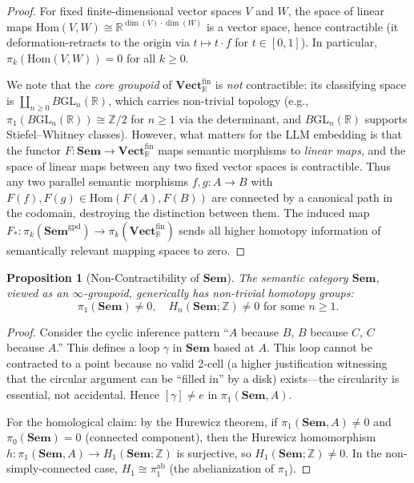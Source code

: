 \documentclass[11pt,a4paper]{article}
\theoremstyle{plain}
\newtheorem{proposition}[theorem]{Proposition}
\theoremstyle{definition}
\theoremstyle{remark}
\newcommand{\Sem}{\mathbf{Sem}}
\newcommand{\Vect}{\mathbf{Vect}}
\newcommand{\Hom}{\mathrm{Hom}}
\newcommand{\Z}{\mathbb{Z}}
\newcommand{\R}{\mathbb{R}}
\begin{document}
\begin{proof}
For fixed finite-dimensional vector spaces $V$ and $W$, the space of linear maps $\Hom(V, W) \cong \R^{\dim(V) \cdot \dim(W)}$ is a vector space, hence contractible (it deformation-retracts to the origin via $t \mapsto t \cdot f$ for $t \in [0,1]$). In particular, $\pi_k(\Hom(V, W)) = 0$ for all $k \geq 0$.

We note that the \emph{core groupoid} of $\Vect_{\R}^{\mathrm{fin}}$ is \emph{not} contractible: its classifying space is $\coprod_{n \geq 0} B\mathrm{GL}_n(\R)$, which carries non-trivial topology (e.g., $\pi_1(B\mathrm{GL}_n(\R)) \cong \Z/2$ for $n \geq 1$ via the determinant, and $B\mathrm{GL}_n(\R)$ supports Stiefel--Whitney classes). However, what matters for the LLM embedding is that the functor $F: \Sem \to \Vect_{\R}^{\mathrm{fin}}$ maps semantic morphisms to \emph{linear maps}, and the space of linear maps between any two fixed vector spaces is contractible. Thus any two parallel semantic morphisms $f, g: A \to B$ with $F(f), F(g) \in \Hom(F(A), F(B))$ are connected by a canonical path in the codomain, destroying the distinction between them. The induced map $F_*: \pi_k(\Sem^{\mathrm{gpd}}) \to \pi_k(\Vect_{\R}^{\mathrm{fin}})$ sends all higher homotopy information of semantically relevant mapping spaces to zero.
\end{proof}

\begin{proposition}[Non-Contractibility of $\Sem$]
\label{prop:sem-non-contractible}
The semantic category $\Sem$, viewed as an $\infty$-groupoid, generically has non-trivial homotopy groups:
\[
\pi_1(\Sem) \neq 0, \quad H_n(\Sem; \Z) \neq 0 \text{ for some } n \geq 1.
\]
\end{proposition}

\begin{proof}
Consider the cyclic inference pattern ``$A$ because $B$, $B$ because $C$, $C$ because $A$.'' This defines a loop $\gamma$ in $\Sem$ based at $A$. This loop cannot be contracted to a point because no valid 2-cell (a higher justification witnessing that the circular argument can be ``filled in'' by a disk) exists---the circularity is essential, not accidental. Hence $[\gamma] \neq e$ in $\pi_1(\Sem, A)$.

For the homological claim: by the Hurewicz theorem, if $\pi_1(\Sem, A) \neq 0$ and $\pi_0(\Sem) = 0$ (connected component), then the Hurewicz homomorphism $h: \pi_1(\Sem, A) \to H_1(\Sem; \Z)$ is surjective, so $H_1(\Sem; \Z) \neq 0$. In the non-simply-connected case, $H_1 \cong \pi_1^{\mathrm{ab}}$ (the abelianization of $\pi_1$).
\end{proof}
\end{document}
